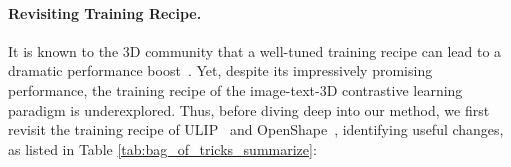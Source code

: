 \documentclass{article} \usepackage{iclr2024_conference,times}
\begin{document}
\begin{table*}[t]
  \centering
  \setlength{\tabcolsep}{11pt}
    \caption{The summary and comparisons between the baseline and our improved training recipe.}
    \vspace{-1em}
  \label{tab:bag_of_tricks_summarize}
  \vspace{-.5em}
\end{table*}
%
 \paragraph{Revisiting Training Recipe.}
It is known to the 3D community that a well-tuned training recipe can lead to a dramatic performance boost~\citep{pointnext}. 
Yet, despite its impressively promising performance, the training recipe of the image-text-3D contrastive learning paradigm is underexplored.  
Thus, before diving deep into our method, we first revisit the training recipe of ULIP~\citep{ulip} and OpenShape~\citep{openshape}, identifying useful changes, as listed in Table \ref{tab:bag_of_tricks_summarize}:
\end{document}
